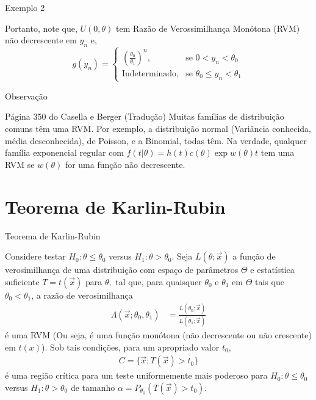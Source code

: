 \documentclass[12pt]{beamer}
\begin{document}
\begin{frame}{Exemplo 2}
\begin{block}{}
\justifying
Portanto, note que, $U(0, \theta)$ tem Razão de Verossimilhança Monótona (RVM) não decrescente em $y_n$ e,
\[
g(y_n) = \begin{cases} 
\left(\frac{\theta_0}{\theta_1}\right)^n, & \text{se } 0 < y_n < \theta_0 \\
\text{Indeterminado}, & \text{se } \theta_0 \leq y_n < \theta_1
\end{cases}
\]
\end{block}
\end{frame}

\begin{frame}{Observação}
\begin{block}{Página 350 do Casella e Berger (Tradução)}
\justifying
Muitas famílias de distribuição comuns têm uma RVM. Por exemplo, a distribuição normal (Variância conhecida, média desconhecida), de Poisson, e a Binomial, todas têm. Na verdade, qualquer família exponencial regular com $f(t|\theta)=h(t)c(\theta)\exp{w(\theta)t}$ tem uma RVM se $w(\theta)$ for uma função não decrescente.
\end{block}
\end{frame}

\section{Teorema de Karlin-Rubin}
\begin{frame}{Teorema de Karlin-Rubin}
\vspace{-0.2cm}
\begin{block}{}
\justifying
Considere testar $H_{0}: \theta \leq \theta_0$ versus $H_{1}: \theta > \theta_0.$
Seja $L(\theta; \Vec{x})$ a função de verosimilhança de uma distribuição com espaço de parâmetros $\Theta$ e estatística suficiente $T = t(\Vec{x})$ para $\theta,$ tal que, para quaisquer $\theta_0$ e $\theta_1$ em $\Theta$ tais que $\theta_0 < \theta_1$, a razão de verosimilhança
\begin{align*}
\Lambda(\Vec{x}; \theta_0, \theta_1) &= \frac{L(\theta_0; \Vec{x})}{L(\theta_1; \Vec{x})}
\end{align*}
é uma RVM (Ou seja, é uma função monótona (não decrescente ou não crescente) em $t(x)$). Sob tais condições, para um apropriado valor $t_{0},$ 
\begin{align*}
    C=\{\Vec{x};T(\Vec{x})> t_{0}\} 
\end{align*}
é uma região crítica para um teste uniformemente mais poderoso para $H_{0}: \theta \leq \theta_0$ versus $H_{1}: \theta > \theta_0$ de tamanho $\alpha=P_{\theta_{0}}(T(\Vec{x})> t_{0})$.
\end{block}
\end{frame}
\end{document}
